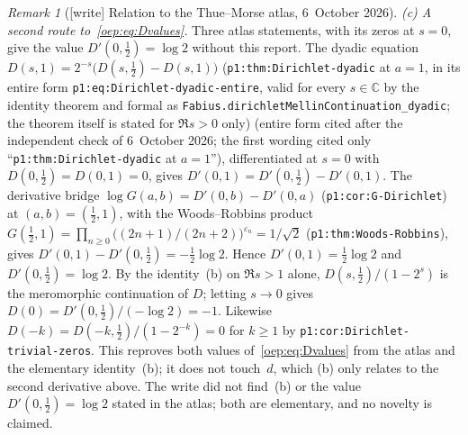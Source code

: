 \documentclass[11pt,letterpaper]{article}
\theoremstyle{remark}\newtheorem{remark}[theorem]{Remark}
\newcommand{\eps}{\varepsilon}
\newcommand{\file}[1]{\nolinkurl{#1}}
\begin{document}
\begin{remark}[{[write]} Relation to the Thue--Morse atlas, 6~October 2026]
\emph{(c) A second route to~\eqref{oep:eq:Dvalues}.} Three atlas statements,
with its zeros at $s=0$, give the value $D'(0,\tfrac12)=\log2$ without this
report. The dyadic
equation $D(s,1)=2^{-s}\bigl(D(s,\tfrac12)-D(s,1)\bigr)$
(\file{p1:thm:Dirichlet-dyadic} at $a=1$, in its entire form
\file{p1:eq:Dirichlet-dyadic-entire}, valid for every $s\in\mathbb C$ by the
identity theorem and formal as
\file{Fabius.dirichletMellinContinuation_dyadic}; the theorem itself is
stated for $\Re s>0$ only)
\textup{(entire form cited after the independent check of 6~October 2026;
the first wording cited only ``\file{p1:thm:Dirichlet-dyadic} at $a=1$'')},
differentiated at $s=0$ with
$D(0,\tfrac12)=D(0,1)=0$, gives $D'(0,1)=D'(0,\tfrac12)-D'(0,1)$. The
derivative bridge $\log G(a,b)=D'(0,b)-D'(0,a)$ (\file{p1:cor:G-Dirichlet})
at $(a,b)=(\tfrac12,1)$, with the Woods--Robbins product
$G(\tfrac12,1)=\prod_{n\ge0}\bigl((2n+1)/(2n+2)\bigr)^{\eps_n}=1/\sqrt2$
(\file{p1:thm:Woods-Robbins}), gives $D'(0,1)-D'(0,\tfrac12)=-\tfrac12\log2$.
Hence $D'(0,1)=\tfrac12\log2$ and $D'(0,\tfrac12)=\log2$. By the identity~(b) on
$\Re s>1$ alone, $D(s,\tfrac12)/(1-2^s)$ is the meromorphic continuation of
$D$; letting $s\to0$ gives
$D(0)=D'(0,\tfrac12)/(-\log2)=-1$. Likewise $D(-k)=D(-k,\tfrac12)/(1-2^{-k})=0$
for $k\ge1$ by \file{p1:cor:Dirichlet-trivial-zeros}. This reproves both
values of~\eqref{oep:eq:Dvalues} from the atlas and the elementary
identity~(b); it does not touch~$d$, which (b) only relates to the second
derivative above. The write did not find~(b) or the value
$D'(0,\tfrac12)=\log2$ stated in the atlas; both are elementary, and no
novelty is claimed.


\end{remark}
\end{document}
